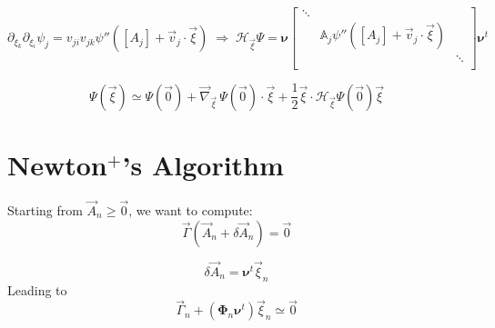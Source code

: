 \documentclass[aps,onecolumn,11pt]{revtex4}
\begin{document}
\begin{equation}
	\partial_{\xi_k}\partial_{\xi_i}\psi_j = v_{ji} v_{jk}\psi''( [A_j] + \vec{v}_j \cdot \vec{\xi} )  
 \; \Rightarrow \;
	\mathcal{H}_{\vec{\xi}} \Psi =  \bm{\nu}
	\begin{bmatrix}
	\ddots & & \\
	  & \mathbb{A}_j \psi''( [A_j] + \vec{v}_j \cdot \vec{\xi} ) & \\
	  & & \ddots\\
	\end{bmatrix}
	\bm{\nu}^t
\end{equation}

\begin{equation}
\Psi(\vec{\xi}) \simeq \Psi(\vec{0}) + \vec{\nabla}_{\vec{\xi}}\, \Psi(\vec{0}) \cdot \vec{\xi} + \dfrac{1}{2} \vec{\xi} \cdot \mathcal{H}_{\vec{\xi}} \Psi(\vec{0}) \vec{\xi}
\end{equation}


   
\section{Newton$^+$'s Algorithm}

Starting from $\vec{A}_n\geq\vec{0}$, we want to compute:
\begin{equation}
	\vec{\Gamma}(\vec{A}_n+\delta\vec{A}_n) = \vec{0}
\end{equation}
	
\begin{equation}
	\delta\vec{A}_n = \bm{\nu}^t \vec{\xi}_n
\end{equation}
Leading to
\begin{equation}
	\vec{\Gamma}_n + (\bm{\Phi}_n \bm{\nu}^t ) \vec{\xi}_n \simeq \vec{0}
\end{equation}
 
\end{document}
